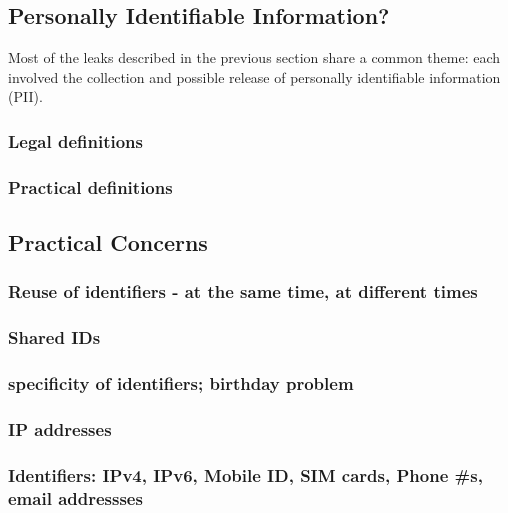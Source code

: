 



\subsection{Personally Identifiable Information?}
Most of the leaks described in the previous section share a common
theme: each involved the collection and possible release of personally
identifiable information (PII).


\subsubsection{Legal definitions}


\subsubsection{Practical definitions}


\subsection{Practical Concerns}


\subsubsection{Reuse of identifiers - at the same time, at different times}
\subsubsection{Shared IDs}
\subsubsection{specificity of identifiers; birthday problem}
\subsubsection{IP addresses}
\subsubsection{Identifiers: IPv4, IPv6, Mobile ID, SIM cards, Phone \#s, email addressses}
